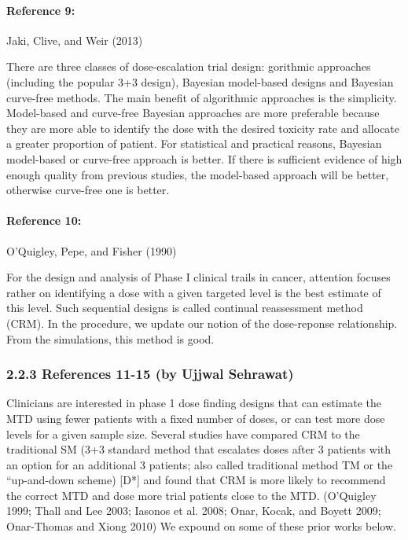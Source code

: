 \documentclass[
]{article}
\begin{document}
\hypertarget{reference-9}{%
\paragraph{Reference 9:}\label{reference-9}}

Jaki, Clive, and Weir (2013)

There are three classes of dose-escalation trial design: gorithmic
approaches (including the popular 3+3 design), Bayesian model-based
designs and Bayesian curve-free methods. The main benefit of algorithmic
approaches is the simplicity. Model-based and curve-free Bayesian
approaches are more preferable because they are more able to identify
the dose with the desired toxicity rate and allocate a greater
proportion of patient. For statistical and practical reasons, Bayesian
model-based or curve-free approach is better. If there is sufficient
evidence of high enough quality from previous studies, the model-based
approach will be better, otherwise curve-free one is better.

\hypertarget{reference-10}{%
\paragraph{Reference 10:}\label{reference-10}}

O'Quigley, Pepe, and Fisher (1990)

For the design and analysis of Phase I clinical trails in cancer,
attention focuses rather on identifying a dose with a given targeted
level is the best estimate of this level. Such sequential designs is
called continual reassessment method (CRM). In the procedure, we update
our notion of the dose-reponse relationship. From the simulations, this
method is good.

\hypertarget{references-11-15-by-ujjwal-sehrawat}{%
\subsubsection{2.2.3 References 11-15 (by Ujjwal
Sehrawat)}\label{references-11-15-by-ujjwal-sehrawat}}

Clinicians are interested in phase 1 dose finding designs that can
estimate the MTD using fewer patients with a fixed number of doses, or
can test more dose levels for a given sample size. Several studies have
compared CRM to the traditional SM (3+3 standard method that escalates
doses after 3 patients with an option for an additional 3 patients; also
called traditional method TM or the ``up-and-down scheme) {[}D*{]} and
found that CRM is more likely to recommend the correct MTD and dose more
trial patients close to the MTD. (O'Quigley 1999; Thall and Lee 2003;
Iasonos et al. 2008; Onar, Kocak, and Boyett 2009; Onar-Thomas and Xiong
2010) We expound on some of these prior works below.
\end{document}
